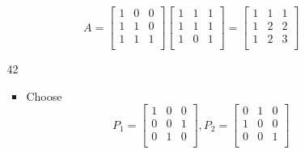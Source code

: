 \documentclass[12pt,letterpaper]{article}
\begin{document}
\begin{enumerate}
\begin{enumerate}
          \[
            A
            =
            \begin{bmatrix}
               1 &  0 &  0 \\
               1 &  1 &  0 \\
               1 &  1 &  1 \\
            \end{bmatrix}
            \begin{bmatrix}
               1 &  1 &  1 \\
               1 &  1 &  1 \\
               1 &  0 &  1 \\
            \end{bmatrix}
            =
            \begin{bmatrix}
               1 &  1 &  1 \\
               1 &  2 &  2 \\
               1 &  2 &  3 \\
            \end{bmatrix}
          \]
        \item [42]
          \begin{itemize}
            \item
              Choose
              \[
                P_1
                =
                \begin{bmatrix}
                  1 & 0 & 0 \\
                  0 & 0 & 1 \\
                  0 & 1 & 0 \\
                \end{bmatrix}
                ,
                P_2
                =
                \begin{bmatrix}
                  0 & 1 & 0 \\
                  1 & 0 & 0 \\
                  0 & 0 & 1 \\
                \end{bmatrix}
              \]


\end{itemize}
\end{enumerate}
\end{enumerate}
\end{document}
